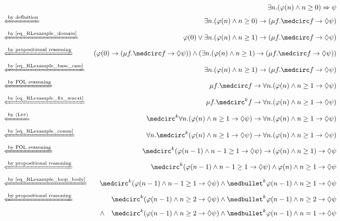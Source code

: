 \documentclass[acmsmall,review,anonymous]{acmart}
\newcommand{\imp}{\to}
\newcommand{\To}{\Rightarrow}
\newcommand{\prule}[1]{\textsc{(#1)}}
\newcommand{\Lfp}{\prule{Lfp}\xspace}
\newcommand{\xif}[1]{\xLeftarrow{\text{#1}}}
\newcommand{\wnext}{{\medcirc}}
\newcommand{\snext}{{\medbullet}}
\newcommand{\eventually}{{\lozenge}}
\begin{document}
\begin{figure}
{
\small
\begin{align*}
&&
\exists n . (\varphi(n) \wedge n \ge 0) \To \psi
\\
&\xif{by definition}&
\exists n . (\varphi(n) \wedge n \ge 0) \imp (\mu f . \wnext f 
\imp \eventually\psi)
\\
&\xif{by~\eqref{eq_RLexample_domain}}&
\varphi(0) \vee \exists n . (\varphi(n) \wedge n \ge 1)
\imp (\mu f . \wnext f \imp\eventually \psi)
\\
&\xif{by propositional reasoning}&
(\varphi(0) \imp (\mu f . \wnext f \imp\eventually \psi))
\wedge (\exists n . (\varphi(n) \wedge n \ge 1)
\imp (\mu f . \wnext f \imp\eventually \psi))
\\
&\xif{by~\eqref{eq_RLexample_base_case}}&
\exists n . (\varphi(n) \wedge n \ge 1)
\imp (\mu f . \wnext f \imp\eventually \psi)
\\
&\xif{by FOL reasoning}&
\mu f . \wnext f \imp \forall n .
(\varphi(n) \wedge n \ge 1 \imp \eventually \psi)
\\
&\xif{by~\eqref{eq_RLexample_fix_wnext}}&
\mu f . \wnext^k f \imp \forall n .
(\varphi(n) \wedge n \ge 1 \imp \eventually \psi)
\\
&\xif{by~\Lfp}&
\wnext^k \forall n . (\varphi(n) \wedge n \ge 1 \imp \eventually \psi)
\imp
\forall n . (\varphi(n) \wedge n \ge 1 \imp \eventually \psi)
\\
&\xif{by~\eqref{eq_RLexample_comm}}&
\forall n . \wnext^k  (\varphi(n) \wedge n \ge 1 \imp \eventually \psi)
\imp
\forall n . (\varphi(n) \wedge n \ge 1 \imp \eventually \psi)
\\
&\xif{by FOL reasoning}&
\wnext^k  (\varphi(n-1) \wedge n-1 \ge 1 \imp \eventually \psi)
\imp
(\varphi(n) \wedge n \ge 1) \imp \eventually \psi
\\
&\xif{by propositional reasoning}&
\wnext^k  (\varphi(n-1) \wedge n-1 \ge 1 \imp \eventually \psi)
\wedge
\varphi(n) \wedge n \ge 1 \imp \eventually \psi
\\
&\xif{by~\eqref{eq_RLexample_loop_body}}&
\wnext^k  (\varphi(n-1) \wedge n-1 \ge 1 \imp \eventually \psi)
\wedge
\snext^k \varphi(n-1) \wedge n \ge 1 \imp \eventually \psi
\\
&\xif{by propositional reasoning}&
\wnext^k  (\varphi(n-1) \wedge n \ge 2 \imp \eventually \psi)
\wedge \snext^k \varphi(n-1) \wedge n \ge 2 \imp \eventually \psi
\\&&
\wedge\quad
\wnext^k  (\varphi(n-1) \wedge n \ge 2 \imp \eventually \psi)
\wedge \snext^k \varphi(n-1) \wedge n = 1 \imp \eventually \psi

\end{align*}}
\end{figure}
\end{document}
